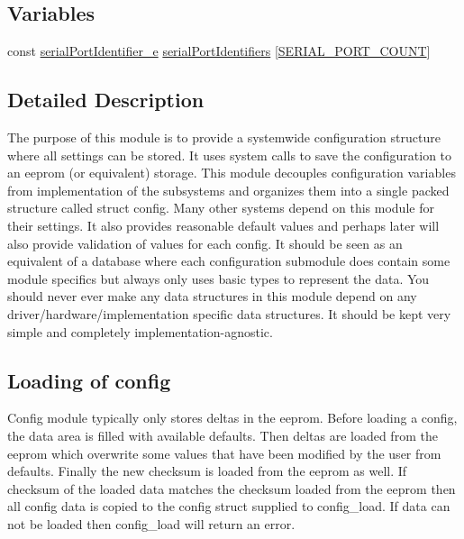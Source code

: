 \subsection*{Variables}
\begin{DoxyCompactItemize}
\item 
const \hyperlink{config_2serial_8h_a5aaf3d2a774f7a0335773299b8d78182}{serial\+Port\+Identifier\+\_\+e} \hyperlink{group__config_ga6604b8703c26d1030d6c12d78bcedfed}{serial\+Port\+Identifiers} \mbox{[}\hyperlink{test_2unit_2target_8h_af040928dacfd97611f1283a6246bfce2}{S\+E\+R\+I\+A\+L\+\_\+\+P\+O\+R\+T\+\_\+\+C\+O\+U\+N\+T}\mbox{]}
\end{DoxyCompactItemize}


\subsection{Detailed Description}
The purpose of this module is to provide a systemwide configuration structure where all settings can be stored. It uses system calls to save the configuration to an eeprom (or equivalent) storage. This module decouples configuration variables from implementation of the subsystems and organizes them into a single packed structure called struct config. Many other systems depend on this module for their settings. It also provides reasonable default values and perhaps later will also provide validation of values for each config. It should be seen as an equivalent of a database where each configuration submodule does contain some module specifics but always only uses basic types to represent the data. You should never ever make any data structures in this module depend on any driver/hardware/implementation specific data structures. It should be kept very simple and completely implementation-\/agnostic.\hypertarget{group__config_config-load}{}\subsection{Loading of config}\label{group__config_config-load}
Config module typically only stores deltas in the eeprom. Before loading a config, the data area is filled with available defaults. Then deltas are loaded from the eeprom which overwrite some values that have been modified by the user from defaults. Finally the new checksum is loaded from the eeprom as well. If checksum of the loaded data matches the checksum loaded from the eeprom then all config data is copied to the config struct supplied to config\+\_\+load. If data can not be loaded then config\+\_\+load will return an error. 

